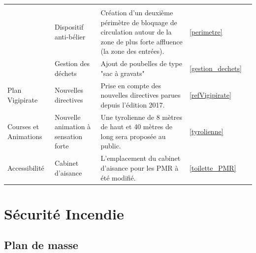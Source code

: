 \documentclass[hidelinks, paper=a4, fontsize=13pt]{report}
\begin{document}
\begin{tabular}{|m{}|m{}|m{}|m{}|m{}|}
\pageref{refProcedurePMA}\\
\cmidrule{2-5}
 & Dispositif anti-bélier & Création d'un deuxième périmètre de bloquage de circulation autour de la zone de plus forte affluence (la zone des entrées). & \ref{perimetre}&\pageref{perimetre}\\
\cmidrule{2-5}
 & Gestion des déchets & Ajout de poubelles de type "sac à gravats" & \ref{gestion_dechets} & \pageref{gestion_dechets}\\
\midrule
Plan Vigipirate & Nouvelles directives & Prise en compte des nouvelles directives parues depuis l'édition 2017. & \ref{refVigipirate}&\pageref{refVigipirate}\\
\midrule
Courses et Animations & Nouvelle animation à sensation forte & Une tyrolienne de 8 mètres de haut et 40 mètres de long sera proposée au public. & \ref{tyrolienne}&\pageref{tyrolienne}\\
\midrule
Accessibilité & Cabinet d'aisance & L'emplacement du cabinet d'aisance pour les PMR à été modifié. & \ref{toilette_PMR}&\pageref{toilette_PMR}\\
\bottomrule

\end{tabular}

\newpage


\chapter{ Sécurité Incendie}

\section{Plan de masse}
\end{document}
